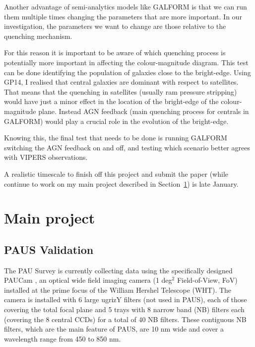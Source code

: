 \documentclass[11pt]{article}
\begin{document}
Another advantage of semi-analytics models like GALFORM is that we can run them multiple times changing the parameters that are more important. In our investigation, the parameters we want to change are those relative to the quenching mechanism.

For this reason it is important to be aware of which quenching process is potentially more important in affecting the colour-magnitude diagram. This test can be done identifying the population of galaxies close to the bright-edge.
 Using GP14, I realised that central galaxies are dominant with respect to satellites. That means that the quenching in satellites (usually ram pressure stripping) would have just a minor effect in the location of the bright-edge of the colour-magnitude plane. Instead AGN feedback (main quenching process for centrals in GALFORM) would play a crucial role in the evolution of the bright-edge. 

Knowing this, the final test that needs to be done is running GALFORM switching the AGN feedback on and off, and testing which scenario better agrees with VIPERS observations.

A realistic timescale to finish off this project and submit the paper (while continue to work on my main project described in Section~\ref{sec:main}) is late January.

\section{Main project}
\label{sec:main}

\subsection{PAUS Validation} 
\label{sub:PAU_val}

The PAU Survey is currently collecting data using the specifically designed PAUCam \citep{castander12}, an optical wide field imaging camera (1 deg$^2$ Field-of-View, FoV) installed at the prime focus of the William Hershel Telescope (WHT).
The camera is installed with 6 large ugrizY filters (not used in PAUS), each of those covering the total focal plane and 5 trays with 8 narrow band (NB) filters each (covering the 8 central CCDs) for a total of 40 NB filters. These contiguous NB filters, which are the main feature of PAUS, are 10 nm wide and cover a wavelength range from 450 to 850 nm. \\
\end{document}
